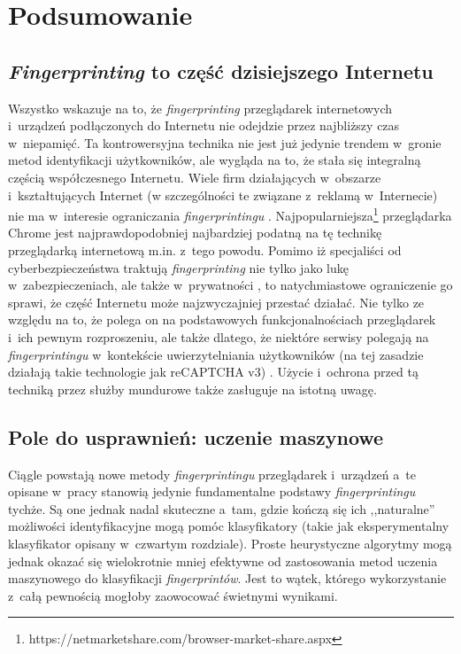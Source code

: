 \chapter*{Podsumowanie}

\section*{\emph{Fingerprinting} to część dzisiejszego Internetu}
Wszystko wskazuje na to, że \emph{fingerprinting} przeglądarek internetowych
i~urządzeń podłączonych do Internetu nie odejdzie przez najbliższy czas
w~niepamięć. Ta kontrowersyjna technika nie jest już jedynie trendem w~gronie
metod identyfikacji użytkowników, ale wygląda na to, że stała się integralną
częścią współczesnego Internetu. Wiele firm działających w~obszarze
i~kształtujących Internet (w szczególności te związane z~reklamą w~Internecie)
nie ma w~interesie ograniczania \emph{fingerprintingu} \cite{al2018beyond}.
Najpopularniejsza\footnote{https://netmarketshare.com/browser-market-share.aspx}
przeglądarka Chrome jest najprawdopodobniej najbardziej podatną \cite{al2017not}
na tę technikę przeglądarką internetową m.in. z~tego powodu. Pomimo iż
specjaliści od cyberbezpieczeństwa traktują \emph{fingerprinting} nie tylko jako
lukę w~zabezpieczeniach, ale także w~prywatności
\cite{mowery2012pixel,al2020too}, to natychmiastowe ograniczenie go sprawi, że
część Internetu może najzwyczajniej przestać działać. Nie tylko ze względu na
to, że polega on na podstawowych funkcjonalnościach przeglądarek i~ich pewnym
rozproszeniu, ale także dlatego, że niektóre serwisy polegają na
\emph{fingerprintingu} w~kontekście uwierzytelniania użytkowników (na tej
zasadzie działają takie technologie jak reCAPTCHA v3) \cite{45581}. Użycie
i~ochrona przed tą techniką przez służby mundurowe także zasługuje na istotną
uwagę.

\section*{Pole do usprawnień: uczenie maszynowe}
Ciągle powstają nowe metody \emph{fingerprintingu} przeglądarek i~urządzeń a~te
opisane w~pracy stanowią jedynie fundamentalne podstawy \emph{fingerprintingu}
tychże. Są one jednak nadal skuteczne a~tam, gdzie kończą się ich ,,naturalne''
możliwości identyfikacyjne mogą pomóc klasyfikatory (takie jak eksperymentalny
klasyfikator opisany w~czwartym rozdziale). Proste heurystyczne algorytmy mogą
jednak okazać się wielokrotnie mniej efektywne od zastosowania metod uczenia
maszynowego do klasyfikacji \emph{fingerprintów}. Jest to wątek, którego
wykorzystanie z~całą pewnością mogłoby zaowocować świetnymi wynikami.

